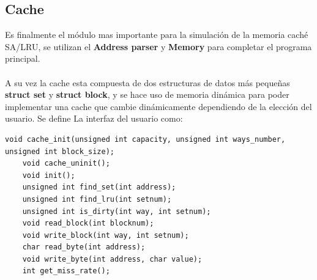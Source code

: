 \documentclass[titlepage,a4paper]{article}
\begin{document}
\subsection{Cache}
    Es finalmente el módulo mas importante para la simulación de la memoria caché SA/LRU, se utilizan el \textbf{Address parser} y \textbf{Memory} para completar el programa principal. 
    \\\\\indent A su vez la cache esta compuesta de dos estructuras de datos más pequeñas \textbf{struct set} y \textbf{struct block}, y se hace uso de memoria dinámica para poder implementar una cache que cambie dinámicamente dependiendo de la elección del usuario. Se define La interfaz del usuario como:
    
    \begin{lstlisting}[style=customC]
    void cache_init(unsigned int capacity, unsigned int ways_number,         unsigned int block_size);
    void cache_uninit();
    void init();
    unsigned int find_set(int address);
    unsigned int find_lru(int setnum);
    unsigned int is_dirty(int way, int setnum);
    void read_block(int blocknum);
    void write_block(int way, int setnum);
    char read_byte(int address);
    void write_byte(int address, char value);
    int get_miss_rate();
    \end{lstlisting}
    
\end{document}
